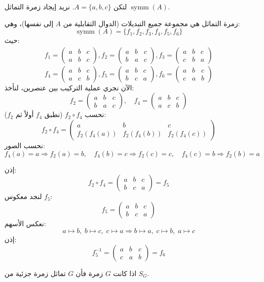 \begin{example}
	لتكن $A = \{a, b, c\}$. نريد إيجاد زمرة التماثل $\operatorname{symm}(A)$.
	
	زمرة التماثل هي مجموعة جميع التبديلات (الدوال التقابلية من $A$ إلى نفسها)، وهي:
	\[
	\operatorname{symm}(A) =
	\{ 
	f_1, f_2, f_3, f_4, f_5, f_6
	\}
	\]
	حيث:
	\begin{align*}
		f_1 =
		\begin{pmatrix}
			a & b & c \\
			a & b & c
		\end{pmatrix} ,
		f_2 =
		\begin{pmatrix}
			a & b & c \\
			b & a & c
		\end{pmatrix} ,
		f_3 =
		\begin{pmatrix}
			a & b & c \\
			c & b & a
		\end{pmatrix} 
	\end{align*}
	\[
	f_4 =
	\begin{pmatrix}
		a & b & c \\
		a & c & b
	\end{pmatrix} ,
	f_5 =
	\begin{pmatrix}
		a & b & c \\
		b & c & a
	\end{pmatrix} ,
	f_6 =
	\begin{pmatrix}
		a & b & c \\
		c & a & b
	\end{pmatrix}
	\]
	الآن نجري عملية التركيب بين عنصرين، لنأخذ:
	\[
	f_2 =
	\begin{pmatrix}
		a & b & c \\
		b & a & c
	\end{pmatrix},
	\quad
	f_4 =
	\begin{pmatrix}
		a & b & c \\
		a & c & b
	\end{pmatrix}
	\]
	نحسب $f_2 \circ f_4$ (نطبق $f_4$ أولاً ثم $f_2$):
	\[
	f_2 \circ f_4 =
	\begin{pmatrix}
		a & b & c \\
		f_2(f_4(a)) & f_2(f_4(b)) & f_2(f_4(c))
	\end{pmatrix}
	\]
	نحسب الصور:
	\[
	f_4(a)=a \Rightarrow f_2(a)=b,\quad
	f_4(b)=c \Rightarrow f_2(c)=c,\quad
	f_4(c)=b \Rightarrow f_2(b)=a
	\]
	
	إذن:
	\[
	f_2 \circ f_4 =
	\begin{pmatrix}
		a & b & c \\
		b & c & a
	\end{pmatrix}
	= f_5
	\]
	لنجد معكوس $f_5$:
	\[
	f_5 =
	\begin{pmatrix}
		a & b & c \\
		b & c & a
	\end{pmatrix}
	\]
	نعكس الأسهم:
	\[
	a \mapsto b,\; b \mapsto c,\; c \mapsto a
	\Rightarrow
	b \mapsto a,\; c \mapsto b,\; a \mapsto c
	\]
	إذن:
	\[
	f_5^{-1} =
	\begin{pmatrix}
		a & b & c \\
		c & a & b
	\end{pmatrix}
	= f_6
	\]
\end{example}

\begin{theorem}
	اذا كانت $G$ زمرة فأن $G$ تماثل زمرة جزئية من $S_G$.
\end{theorem}
